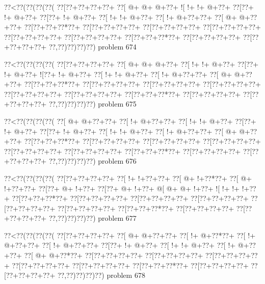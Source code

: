 \vbox{\vbox{\goo
\0??<\0??(\0??(\0??(\0??(
\0??[\0??+\0??+\0??+\0??+
\0??[\- @+\- @+\- @+\0??+
\- ![\- !+\- !+\- @+\0??+
\0??[\0??+\- !+\- @+\0??+
\0??[\0??+\- !+\- @+\0??+
\0??[\- !+\- !+\- @+\0??+
\0??[\- !+\- @+\0??+\0??+
\0??[\- @+\- @+\0??+\0??+
\0??[\0??+\0??+\0??*\0??+
\0??[\0??+\0??+\0??+\0??+
\0??[\0??+\0??+\0??+\0??+
\0??[\0??+\0??+\0??+\0??+
\0??[\0??+\0??+\0??+\0??+
\0??[\0??+\0??+\0??+\0??+
\0??[\0??+\0??+\0??*\0??+
\0??[\0??+\0??+\0??+\0??+
\0??[\0??+\0??+\0??+\0??+
\0??,\0??)\0??)\0??)\0??)
}
\hfil problem 674\hfil\break
}

\vbox{\vbox{\goo
\0??<\0??(\0??(\0??(\0??(
\0??[\0??+\0??+\0??+\0??+
\0??[\- @+\- @+\- @+\0??+
\0??[\- !+\- !+\- @+\0??+
\0??[\0??+\- !+\- @+\0??+
\- ![\0??+\- !+\- @+\0??+
\0??[\- !+\- !+\- @+\0??+
\0??[\- !+\- @+\0??+\0??+
\0??[\- @+\- @+\0??+\0??+
\0??[\0??+\0??+\0??*\0??+
\0??[\0??+\0??+\0??+\0??+
\0??[\0??+\0??+\0??+\0??+
\0??[\0??+\0??+\0??+\0??+
\0??[\0??+\0??+\0??+\0??+
\0??[\0??+\0??+\0??+\0??+
\0??[\0??+\0??+\0??*\0??+
\0??[\0??+\0??+\0??+\0??+
\0??[\0??+\0??+\0??+\0??+
\0??,\0??)\0??)\0??)\0??)
}
\hfil problem 675\hfil\break
}

\vbox{\vbox{\goo
\0??<\0??(\0??(\0??(\0??(
\0??[\- @+\- @+\0??+\0??+
\0??[\- !+\- @+\0??+\0??+
\0??[\- !+\- !+\- @+\0??+
\0??[\0??+\- !+\- @+\0??+
\0??[\0??+\- !+\- @+\0??+
\0??[\- !+\- !+\- @+\0??+
\0??[\- !+\- @+\0??+\0??+
\0??[\- @+\- @+\0??+\0??+
\0??[\0??+\0??+\0??*\0??+
\0??[\0??+\0??+\0??+\0??+
\0??[\0??+\0??+\0??+\0??+
\0??[\0??+\0??+\0??+\0??+
\0??[\0??+\0??+\0??+\0??+
\0??[\0??+\0??+\0??+\0??+
\0??[\0??+\0??+\0??*\0??+
\0??[\0??+\0??+\0??+\0??+
\0??[\0??+\0??+\0??+\0??+
\0??,\0??)\0??)\0??)\0??)
}
\hfil problem 676\hfil\break
}

\vbox{\vbox{\goo
\0??<\0??(\0??(\0??(\0??(
\0??[\0??+\0??+\0??+\0??+
\0??[\- !+\- !+\0??+\0??+
\0??[\- @+\- !+\0??*\0??+
\0??[\- @+\- !+\0??+\0??+
\0??[\0??+\- @+\- !+\0??+
\0??[\0??+\- @+\- !+\0??+
\- @[\- @+\- @+\- !+\0??+
\- ![\- !+\- !+\- !+\0??+
\0??[\0??+\0??+\0??*\0??+
\0??[\0??+\0??+\0??+\0??+
\0??[\0??+\0??+\0??+\0??+
\0??[\0??+\0??+\0??+\0??+
\0??[\0??+\0??+\0??+\0??+
\0??[\0??+\0??+\0??+\0??+
\0??[\0??+\0??+\0??*\0??+
\0??[\0??+\0??+\0??+\0??+
\0??[\0??+\0??+\0??+\0??+
\0??,\0??)\0??)\0??)\0??)
}
\hfil problem 677\hfil\break
}

\vbox{\vbox{\goo
\0??<\0??(\0??(\0??(\0??(
\0??[\0??+\0??+\0??+\0??+
\0??[\- @+\- @+\0??+\0??+
\0??[\- !+\- @+\0??*\0??+
\0??[\- !+\- @+\0??+\0??+
\0??[\- !+\- @+\0??+\0??+
\0??[\0??+\- !+\- @+\0??+
\0??[\- !+\- !+\- @+\0??+
\0??[\- !+\- @+\0??+\0??+
\0??[\- @+\- @+\0??*\0??+
\0??[\0??+\0??+\0??+\0??+
\0??[\0??+\0??+\0??+\0??+
\0??[\0??+\0??+\0??+\0??+
\0??[\0??+\0??+\0??+\0??+
\0??[\0??+\0??+\0??+\0??+
\0??[\0??+\0??+\0??*\0??+
\0??[\0??+\0??+\0??+\0??+
\0??[\0??+\0??+\0??+\0??+
\0??,\0??)\0??)\0??)\0??)
}
\hfil problem 678\hfil\break
}

